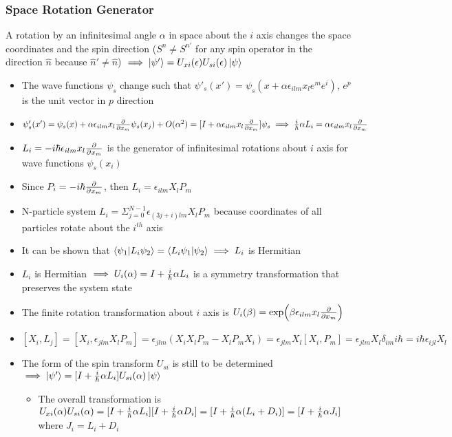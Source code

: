 \documentclass[8pt,t,mathserif,aspectratio=169]{beamer}
\begin{document}
\begin{frame}
  \frametitle{Space Rotation Generator}
  \vspace{1mm}
  A rotation by an infinitesimal angle $\alpha$ in space about the $i$ axis changes the space coordinates and the spin direction ($S^n \neq S^{n'}$ for any spin operator in the direction $\hat{n}$ because $\hat{n}' \neq \hat{n}$) $\implies \ket{\psi'} = U_{xi}(\epsilon) U_{si}(\epsilon) \ket{\psi}$
  \begin{itemize}
    \item The wave functions $\psi_s$ change such that $\psi'_s(x') = \psi_s(x + \alpha \epsilon_{ilm} x_l e^m e^i)$, $e^p$ is the unit vector in $p$ direction
    \item $\psi'_s(x') = \psi_s(x) + \alpha \epsilon_{ilm} x_l {\partial \over \partial x_m} \psi_s(x_j) + O(\alpha^2) = [I + \alpha \epsilon_{ilm} x_l {\partial \over \partial x_m}] \psi_s \implies {i \over \hbar} \alpha L_i = \alpha \epsilon_{ilm} x_l {\partial \over \partial x_m}$
    \item $L_i = -i \hbar \epsilon_{ilm} x_l {\partial \over \partial x_m}$ is the generator of infinitesimal rotations about $i$ axis for wave functions $\psi_s(x_i)$
    \item Since $P_i = -i \hbar {\partial \over \partial x_m}$, then $L_i = \epsilon_{ilm} X_l P_m$
    \item N-particle system $L_i = \Sigma^{N -1}_{j = 0} \epsilon_{(3j + i)lm} X_l P_m$ because coordinates of all particles rotate about the $i^{th}$ axis
    \item It can be shown that $\bra{\psi_1}\ket{L_i \psi_2} = \bra{L_i \psi_1} \ket{\psi_2} \implies L_i$ is Hermitian 
    \item $L_i$ is Hermitian $\implies U_i(\alpha) = I + {i \over \hbar} \alpha L_i$ is a symmetry transformation that preserves the system state
    \item The finite rotation transformation about $i$ axis is $U_i(\beta) = \exp(\beta \epsilon_{ilm} x_l {\partial \over \partial x_m})$
    \item $[X_i,L_j] = [X_i,\epsilon_{jlm} X_l P_m] = \epsilon_{jlm} (X_i X_l P_m - X_l P_m X_i) = \epsilon_{jlm} X_l [X_i,P_m] = \epsilon_{jlm} X_l \delta_{im} i \hbar = i \hbar \epsilon_{ijl} X_l$
    \item The form of the spin transform $U_{si}$ is still to be determined $\implies \ket{\psi'} = [I + {i \over \hbar} \alpha L_i] U_{si}(\alpha) \ket{\psi}$
    \begin{itemize}
      \item The overall transformation is $U_{xi}(\alpha) U_{si}(\alpha) = [I + {i \over \hbar} \alpha L_i] [I + {i \over \hbar} \alpha D_i] = [I + {i \over \hbar} \alpha (L_i + D_i)] = [I + {i \over \hbar} \alpha J_i]$ where $J_i = L_i + D_i$
    \end{itemize}
  \end{itemize}
\end{frame}
\end{document}
